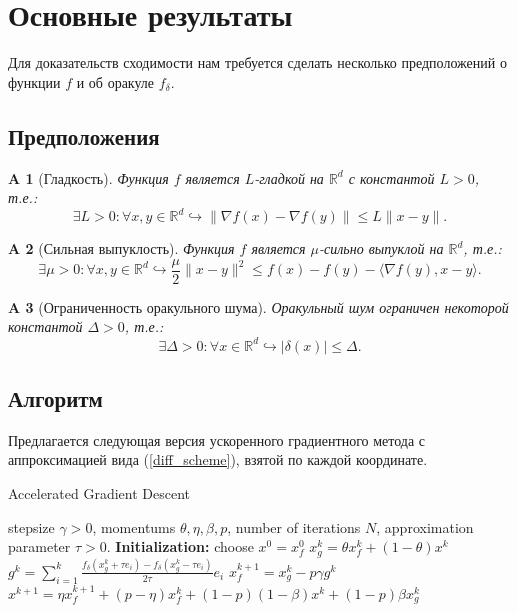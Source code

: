 \documentclass{article}
\newtheorem{assumption}{A}
\newcommand{\R}{\mathbb{R}}
\begin{document}
\section{Основные результаты}
Для доказательств сходимости нам требуется сделать несколько предположений о функции $f$ и об оракуле $f_\delta$.
\subsection{Предположения}
\begin{assumption}[Гладкость]\label{A1}
 Функция $f$ является $L$-гладкой на $\R^d$ с константой $L > 0$, т.е.:
 \begin{equation}
  \exists L > 0: \forall x, y \in \R^d \hookrightarrow \|\nabla f(x) - \nabla f(y)\| \leqslant L \|x - y\|.
  \label{l_smoothness}
 \end{equation}
\end{assumption}

\begin{assumption}[Сильная выпуклость]\label{A2}
 Функция $f$ является $ \mu$-сильно выпуклой на $\R^d$, т.е.:
 \begin{equation}
  \exists \mu > 0: \forall x, y \in \R^d \hookrightarrow \frac{\mu}{2}\|x - y\|^2 \leqslant f(x) - f(y) - \langle \nabla f(y), x - y \rangle.
  \label{mu_strongly_convexity}
 \end{equation}
\end{assumption}


\begin{assumption}[Ограниченность оракульного шума]\label{A3}
 Оракульный шум ограничен некоторой константой $\Delta > 0$, т.е.:
 \begin{equation}
  \exists \Delta > 0: \forall x \in \R^d \hookrightarrow |\delta(x)| \leqslant \Delta.
  \label{bounded_oracle_noise}
 \end{equation}
\end{assumption}


\subsection{Алгоритм}
Предлагается следующая версия ускоренного градиентного метода с аппроксимацией вида (\ref{diff_scheme}), взятой по каждой координате.
\begin{algorithm}[!ht]
\caption{ Accelerated Gradient Descent }\label{agd_algorithm}
\begin{algorithmic}[1]
   \REQUIRE stepsize $\gamma > 0$, momentums $\theta, \eta, \beta, p$, number of iterations $N$, approximation parameter $\tau > 0$.
   \textbf{Initialization:} choose $x^0 = x_f^0$
		\STATE $x_g^k = \theta x_f^k + (1 - \theta)x^k$
		\STATE $g^k = \sum\limits_{i = 1}^k \frac{f_\delta(x_g^k + \tau e_i) - f_\delta(x_g^k - \tau e_i)}{2\tau}e_i$
		\STATE $x_f^{k + 1} = x_g^k - p \gamma g^k$
		\STATE $x^{k + 1} = \eta x_f^{k + 1} + (p - \eta) x_f^k + (1 - p)(1 - \beta) x^k + (1 - p)\beta x_g^k$
   \ENDFOR
\end{algorithmic}
\end{algorithm}
\end{document}
